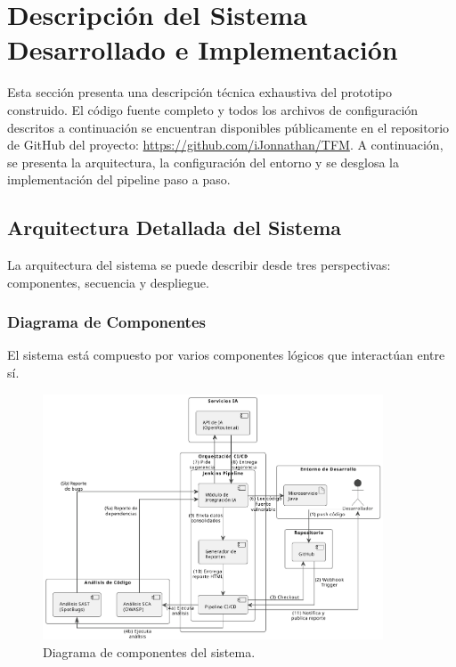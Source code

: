 \section{Descripción del Sistema Desarrollado e Implementación}
\label{sec:descripcionsistema_desarrollo}
Esta sección presenta una descripción técnica exhaustiva del prototipo construido. El código fuente completo y todos los archivos de configuración descritos a continuación se encuentran disponibles públicamente en el repositorio de GitHub del proyecto: \url{https://github.com/iJonnathan/TFM}. 
A continuación, se presenta la arquitectura, la configuración del entorno y se desglosa la implementación del pipeline paso a paso.

\subsection{Arquitectura Detallada del Sistema}

La arquitectura del sistema se puede describir desde tres perspectivas: componentes, secuencia y despliegue.

\subsubsection{Diagrama de Componentes}

El sistema está compuesto por varios componentes lógicos que interactúan entre sí.

\begin{figure}[h!]
\centering
\centering
    \includegraphics[width=0.9\textwidth]{contenido/imagenes/4_componentes.pdf}
    \caption{Diagrama de componentes del sistema.}
    \label{fig:componentes}
\end{figure}

